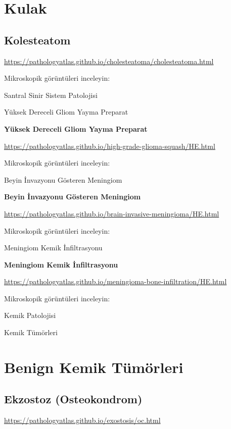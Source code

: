 \documentclass[
  letterpaper,
  DIV=11,
  numbers=noendperiod]{scrreprt}
\begin{document}
\hypertarget{kulak}{%
\chapter{Kulak}\label{kulak}}

\hypertarget{kolesteatom}{%
\section{Kolesteatom}\label{kolesteatom}}

\url{https://pathologyatlas.github.io/cholesteatoma/cholesteatoma.html}

Mikroskopik görüntüleri inceleyin:

Santral Sinir Sistem Patolojisi

Yüksek Dereceli Gliom Yayma Preparat

\textbf{Yüksek Dereceli Gliom Yayma Preparat}

\url{https://pathologyatlas.github.io/high-grade-glioma-squash/HE.html}

Mikroskopik görüntüleri inceleyin:

Beyin İnvazyonu Gösteren Meningiom

\textbf{Beyin İnvazyonu Gösteren Meningiom}

\url{https://pathologyatlas.github.io/brain-invasive-meningioma/HE.html}

Mikroskopik görüntüleri inceleyin:

Meningiom Kemik İnfiltrasyonu

\textbf{Meningiom Kemik İnfiltrasyonu}

\url{https://pathologyatlas.github.io/meningioma-bone-infiltration/HE.html}

Mikroskopik görüntüleri inceleyin:

Kemik Patolojisi

Kemik Tümörleri

\hypertarget{benign-kemik-tuxfcmuxf6rleri}{%
\chapter{Benign Kemik Tümörleri}\label{benign-kemik-tuxfcmuxf6rleri}}

\hypertarget{ekzostoz-osteokondrom}{%
\section{Ekzostoz (Osteokondrom)}\label{ekzostoz-osteokondrom}}

\url{https://pathologyatlas.github.io/exostosis/oc.html}
\end{document}
